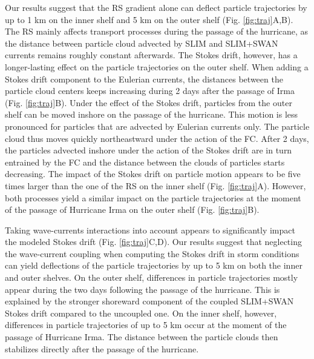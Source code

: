 Our results suggest that the RS gradient alone can deflect particle trajectories by up to 1 km on the inner shelf and 5 km on the outer shelf (Fig. \ref{fig:traj}A,B). The RS mainly affects transport processes during the passage of the hurricane, as the distance between particle cloud advected by SLIM and SLIM+SWAN currents remains roughly constant afterwards. The Stokes drift, however, has a longer-lasting effect on the particle trajectories on the outer shelf. When adding a Stokes drift component to the Eulerian currents, the distances between the particle cloud centers keeps increasing during 2 days after the passage of Irma (Fig. \ref{fig:traj}B). Under the effect of the Stokes drift, particles from the outer shelf can be moved inshore on the passage of the hurricane. This motion is less pronounced for particles that are advected by Eulerian currents only. The particle cloud thus moves quickly northeastward under the action of the FC. After 2 days, the particles advected inshore under the action of the Stokes drift are in turn entrained by the FC and the distance between the clouds of particles starts decreasing. The impact of the Stokes drift on particle motion appears to be five times larger than the one of the RS on the inner shelf (Fig. \ref{fig:traj}A). However, both processes yield a similar impact on the particle trajectories at the moment of the passage of Hurricane Irma on the outer shelf (Fig. \ref{fig:traj}B).

Taking wave-currents interactions into account appears to significantly impact the modeled Stokes drift (Fig. \ref{fig:traj}C,D). Our results suggest that neglecting the wave-current coupling when computing the Stokes drift in storm conditions can yield deflections of the particle trajectories by up to 5 km on both the inner and outer shelves. On the outer shelf, differences in particle trajectories mostly appear during the two days following the passage of the hurricane. This is explained by the stronger shoreward component of the coupled SLIM+SWAN Stokes drift compared to the uncoupled one. On the inner shelf, however, differences in particle trajectories of up to 5 km occur at the moment of the passage of Hurricane Irma. The distance between the particle clouds then stabilizes directly after the passage of the hurricane.


